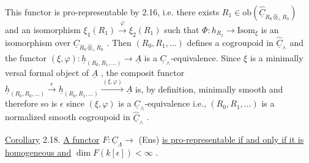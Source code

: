 \begin{center}
\end{center}
This functor is pro-representable by 2.16, i.e. there exists  $R_{1} \in \mathrm{ob}(\hat{\underline{C}}_{R_{0} \hat{\otimes}_{\wedge} R_{0}})$  and an isomorphism  $\xi_{1}(R_{1}) \xrightarrow{\ \varphi\ } \xi_{2}(R_{1})$  such that  $\Phi : h_{R_{1}} \to \mathrm{Isom}_{\xi}$  is an isomorphism over  $\underline{C}_{R_{0} \hat{\otimes}_{\wedge} R_{0}}$  . Then  $(R_{0},R_{1},\ldots)$  defines a cogroupoid in  $\hat{\underline{C}}_{\wedge}$  and the functor $(\xi,\varphi) : \underline{h}_{(R_{0},R_{1},\ldots)} \to \underline{A}$  is a  $\underline{C}_{\wedge}$-equivalence. Since  $\xi$  is a minimally versal formal object of  $\underline{A}$  , the composit functor  $\underline{h}_{(R_{0},R_{0},\ldots)} \xrightarrow{\ \epsilon\ } \underline{h}_{(R_{0},R_{1},\ldots)} \xrightarrow{\ (\xi,\varphi)\ } \underline{A}$ is, by definition, minimally smooth and therefore so is  $\epsilon$  since  $(\xi,\varphi)$  is a $\underline{C}_{\wedge}$-equivalence i.e.,  $(R_{0},R_{1},\ldots)$  is a normalized smooth cogroupoid in  $\hat{\underline{C}}_{\wedge}$  .



\underline{Corollary} 2.18.  \underline{A functor}  $F : \underline{C}_\Lambda \longrightarrow$ (Ens)  \underline{is pro-representable if and only if it is homogeneous and}  $\dim F(k[\epsilon]) < \infty$  .

